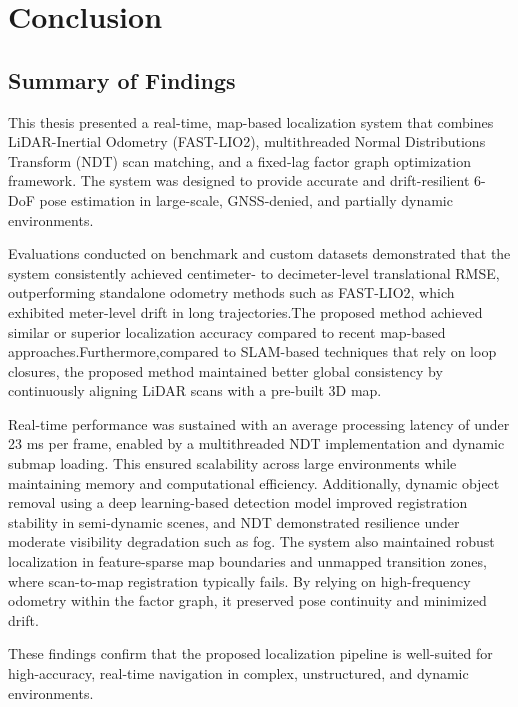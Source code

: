 \chapter{Conclusion}
\label{ch:sum}
\section{Summary of Findings}
This thesis presented a real-time, map-based localization system that combines LiDAR-Inertial Odometry (FAST-LIO2), multithreaded Normal Distributions Transform (NDT) scan matching, and a fixed-lag factor graph optimization framework. The system was designed to provide accurate and drift-resilient 6-DoF pose estimation in large-scale, GNSS-denied, and partially dynamic environments.

Evaluations conducted on benchmark and custom datasets demonstrated that the system consistently achieved centimeter- to decimeter-level translational RMSE, outperforming standalone odometry methods such as FAST-LIO2, which exhibited meter-level drift in long trajectories.The proposed method achieved similar or superior localization
accuracy compared to recent map-based approaches.Furthermore,compared to SLAM-based techniques that rely on loop closures, the proposed method maintained better global consistency by continuously aligning LiDAR scans with a pre-built 3D map.

Real-time performance was sustained with an average processing latency of under 23 ms per frame, enabled by a multithreaded NDT implementation and dynamic submap loading. This ensured scalability across large environments while maintaining memory and computational efficiency. Additionally, dynamic object removal using a deep learning-based detection model improved registration stability in semi-dynamic scenes, and NDT demonstrated resilience under moderate visibility degradation such as fog.
The system also maintained robust localization in feature-sparse map boundaries and unmapped transition zones, where scan-to-map registration typically fails. By relying on high-frequency odometry within the factor graph, it preserved pose continuity and minimized drift.

These findings confirm that the proposed localization pipeline is well-suited for high-accuracy, real-time navigation in complex, unstructured, and dynamic environments.

